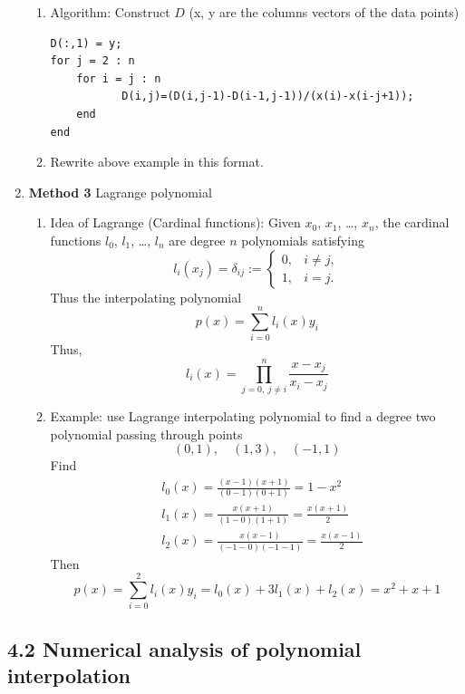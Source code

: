 \documentclass{article}
\theoremstyle{remark}
\begin{document}
\begin{enumerate}
\begin{enumerate}
\item Algorithm: Construct $D$ (x, y are the columns vectors of the data points)
\begin{verbatim}
D(:,1) = y;
for j = 2 : n
    for i = j : n
    	   D(i,j)=(D(i,j-1)-D(i-1,j-1))/(x(i)-x(i-j+1));
    end
end
\end{verbatim}

\item Rewrite above example in this format. 
\end{enumerate}


\item {\bf Method 3} Lagrange polynomial
\begin{enumerate}
\item Idea of Lagrange (Cardinal functions): Given $x_0$, $x_1$, \dots, $x_n$, the cardinal functions $l_0$, $l_1$, \dots, $l_n$ are degree $n$ polynomials satisfying
$$
l_i(x_j) = \delta_{ij} := \left\{
\begin{array}{ll}
0, & i\neq j,\\
1, & i = j.
\end{array}
\right.
$$ 
Thus the interpolating polynomial
$$
p(x) = \sum_{i=0}^n l_i(x)y_i
$$
Thus,
$$
l_i(x) = \prod_{j=0, ~ j\neq i}^n \frac{x-x_j}{x_i-x_j}
$$

\item Example: use Lagrange interpolating polynomial to  find a degree two polynomial passing through points
$$
(0,1), \quad (1,3),\quad (-1,1)
$$
Find
\begin{equation}
\nonumber
\begin{split}
& l_0(x) = \frac{(x-1)(x+1)}{(0-1)(0+1)} = 1-x^2\\
& l_1(x) = \frac{x(x+1)}{(1-0)(1+1)} = \frac{x(x+1)}{2}\\
& l_2(x) = \frac{x(x-1)}{(-1-0)(-1-1)} = \frac{x(x-1)}{2}
\end{split}
\end{equation}
Then
$$
p(x) = \sum_{i=0}^2 l_i(x)y_i = l_0(x) + 3l_1(x)+l_2 (x) = x^2+x+1
$$
\end{enumerate}
\end{enumerate}


\subsection{4.2 Numerical analysis of polynomial interpolation}
\end{document}
